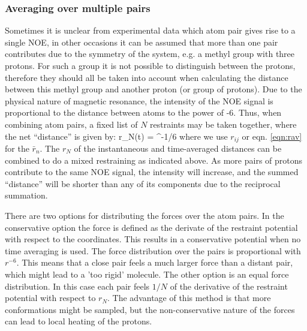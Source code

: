 \subsubsection{Averaging over multiple pairs} 

Sometimes it is unclear from experimental data which atom pair
gives rise to a single NOE, in other occasions it can be assumed that
more than one pair contributes due to the symmetry of the system, e.g. a
methyl group with three protons. For such a group it is not possible 
to distinguish between the protons, therefore they should all be taken into
account when calculating the distance between this methyl group and another
proton (or group of protons).
Due to the physical nature of magnetic resonance, the intensity of the
NOE signal is proportional to the distance between atoms to the power of -6.
Thus, when combining atom pairs, 
a fixed list of $N$ restraints may be taken together, 
where the net ``distance'' is given by:
\beq
r_N(t) = \left [\sum_{n=1}^{N} \bar{r}_{n}(t)^{-6} \right]^{-1/6}
\label{eqn:rsix}
\eeq
where we use $r_{ij}$ or eqn. \ref{eqn:rav} for the $\bar{r}_{n}$.
The $r_N$ of the instantaneous and time-averaged distances
can be combined to do a mixed restraining as indicated above.
As more pairs of protons contribute to the same NOE signal, the intensity
will increase, and the summed ``distance'' will be shorter than any of
its components due to the reciprocal summation. 

There are two options for distributing the forces over the atom pairs.
In the conservative option the force is defined as the derivate of the
restraint potential with respect to the coordinates. This results in
a conservative potential when no time averaging is used.
The force distribution over the pairs is proportional with $r^{-6}$.
This means that a close pair feels a much larger force than a distant pair,
which might lead to a 'too rigid' molecule.
The other option is an equal force distribution. In this case each pair
feels $1/N$ of the derivative of the restraint potential with respect to 
$r_N$. The advantage of this method is that more conformations might be
sampled, but the non-conservative nature of the forces can lead to
local heating of the protons.

